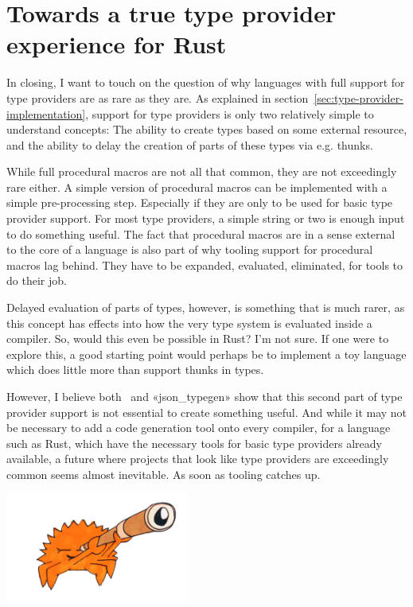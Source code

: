 \section{Towards a true type provider experience for Rust}

In closing, I want to touch on the question of why languages with full support for type providers are as rare as they are. As explained in section~\ref{sec:type-provider-implementation}, support for type providers is only two relatively simple to understand concepts: The ability to create types based on some external resource, and the ability to delay the creation of parts of these types via e.g. thunks.

While full procedural macros are not all that common, they are not exceedingly rare either. A simple version of procedural macros can be implemented with a simple pre-processing step. Especially if they are only to be used for basic type provider support. For most type providers, a simple string or two is enough input to do something useful. The fact that procedural macros are in a sense external to the core of a language is also part of why tooling support for procedural macros lag behind. They have to be expanded, evaluated, eliminated, for tools to do their job.

Delayed evaluation of parts of types, however, is something that is much rarer, as this concept has effects into how the very type system is evaluated inside a compiler. So, would this even be possible in Rust? I'm not sure. If one were to explore this, a good starting point would perhaps be to implement a toy language which does little more than support thunks in types.

However, I believe both \fsharpdata\ and «json_typegen» show that this second part of type provider support is not essential to create something useful. And while it may not be necessary to add a code generation tool onto every compiler, for a language such as Rust, which have the necessary tools for basic type providers already available, a future where projects that look like type providers are exceedingly common seems almost inevitable. As soon as tooling catches up.

\begin{center}
\vspace*{8cm}
\includegraphics[width=6cm, angle=0, trim=10 10 10 10, clip]{ferris/telescope}
\end{center}
